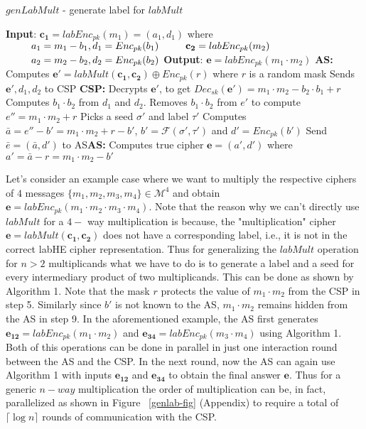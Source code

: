 \begin{algorithm}
\caption{$genLabMult$ - generate label for $labMult$}
\begin{algorithmic}[1]
\STATEx
\textbf{Input}: $\mathbf{c_1}=labEnc_{pk}(m_1)=(a_1,d_1)$  where\STATEx $\hspace{0.9cm} a_1= m_1-b_1, d_1=Enc_{pk}(b_1)$\STATEx $\hspace{0.9cm} \mathbf{c_2}=labEnc_{pk}(m_2)$
\STATEx$\hspace{0.9cm} a_2= m_2-b_2, d_2=Enc_{pk}(b_2)$
\STATEx \textbf{Output}: $\mathbf{e}=labEnc_{pk}(m_1\cdot m_2)$ 
\STATEx \textbf{\textsf{AS}:} \STATE Computes $\textbf{e}'=labMult(\mathbf{c_1,c_2}) \oplus Enc_{pk}(r)$ where $r$ is a random mask \STATE Sends $\mathbf{e'},d_1,d_2$ to \textsf{CSP}
\STATEx \textbf{\textsf{CSP}:}
\STATE Decrypts $\mathbf{e'}$, to get $Dec_{sk}(\mathbf{e}')=m_1\cdot m_2 -b_2\cdot b_1 + r$
\STATE Computes $b_1 \cdot b_2$ from $d_1$ and $d_2$.
\STATE Removes $b_1\cdot b_2$ from $e'$ to compute $e''=m_1\cdot m_2+r$
\STATE Picks a seed $\sigma'$ and label $\tau'$
\STATE Computes $\bar{a}=e''-b'=m_1\cdot m_2 +r -b'$, $b'=\mathcal{F}(\sigma',\tau')$ and $d'=Enc_{pk}(b')$
\STATE Send $\bar{e}=(\bar{a},d')$ to \textsf{AS}\STATEx \textbf{\textsf{AS}:}
\STATE Computes true cipher $\mathbf{e}=(a',d')$ where $a'=\bar{a}-r=m_1\cdot m_2 - b'$
 \end{algorithmic}
\end{algorithm}
Let's consider an example case where we want to multiply the respective ciphers of  $4$ messages $\{m_1,m_2,m_3,m_4\} \in \mathcal{M}^4$ and obtain $\mathbf{e}=labEnc_{pk}(m_1\cdot m_2\cdot m_3 \cdot m_4)$. Note that the reason why we can't directly use  $labMult$ for a $4-$ way multiplication is because, the "multiplication" cipher $\mathbf{e}=labMult(\mathbf{c_1},\mathbf{c_2})$ does not have  a corresponding label, i.e., it is not in the correct \textsf{labHE} cipher representation. Thus for generalizing the $labMult$ operation for $n>2$ multiplicands what we have to do is to generate a label and a seed for every intermediary product of two multiplicands. This can be done as shown by Algorithm 1. Note that the mask $r$ protects the value of $m_1\cdot m_2$ from the \textsf{CSP} in step 5. Similarly since $b'$ is not known to the \textsf{AS}, $m_1\cdot m_2$ remains hidden from the \textsf{AS} in step 9. In the aforementioned example, the \textsf{AS} first generates $\mathbf{e_{12}}=labEnc_{pk}(m_1\cdot m_2)$ and $\mathbf{e_{34}}=labEnc_{pk}(m_3\cdot m_4)$ using Algorithm 1. Both of this operations can be done in parallel in just one interaction round between the \textsf{AS} and the \textsf{CSP}. In the next round, now the \textsf{AS} can again use Algorithm 1 with inputs $\mathbf{e_{12}}$ and $\mathbf{e_{34}}$ to obtain the final answer $\mathbf{e}$. %
Thus for a generic $n-way$ multiplication the order of multiplication can be, in fact, parallelized as  shown in Figure ~\ref{genlab-fig} (Appendix) to require a total of $\lceil \log n\rceil$ rounds of communication with the \textsf{CSP}.\\
